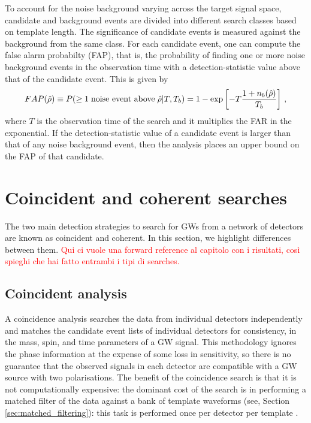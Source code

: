 \documentclass[binding=0.6cm, LaM]{sapthesis}
\newcommand{\fpg}[1]{\textcolor{red}{#1} }
\begin{document}
	To account for the noise background varying across the target signal space, 
	candidate and background events are divided into different search classes based on template length. 
	The significance of candidate events is measured against the background from the same class. 
	For each candidate event, one can compute the false alarm probabilty (FAP), that is, the probability of finding one or more 
	noise background events in the observation time with a detection-statistic value above that of the candidate event.  This is given by 
		\begin{equation}
			FAP(\hat \rho) \equiv P(\geq 1 \hspace*{0.1cm}\text{noise event above}\hspace*{0.1cm} \hat \rho|T,T_b) = 1 - \exp\left[-T{{1+n_b(\hat \rho)} \over{T_b}}\right]\,,
		\end{equation}
	where $T$ is the observation time of the search and it multiplies the FAR in the exponential.
	If the detection-statistic value of a candidate event is larger 
	than that of any noise background event, 
	then the analysis places an upper bound on the FAP of that candidate. 
	

\section{Coincident and coherent searches}

	The two main detection strategies to search for GWs 	
	from a network of detectors are known as coincident and coherent.  In this section, we highlight differences between them.  \fpg{Qui ci vuole una forward reference al capitolo con i risultati, cos\`i spieghi che hai fatto entrambi i tipi di searches.}

\subsection{Coincident analysis}

	A coincidence analysis searches the data from individual detectors independently 	
	and matches the candidate event lists of individual detectors for consistency,
	in the mass, spin, and time parameters of a GW signal.
	This methodology ignores the phase information at the expense of some loss in sensitivity, 
	so there is no guarantee that the observed signals in each detector 
	are compatible with a GW source with two polarisations.
	The benefit of the coincidence search is that it is not computationally expensive: 
	the dominant cost of the search is in performing a matched filter 
	of the data against a bank of template waveforms (see, Section \ref{sec:matched_filtering}):
        this task is performed once per detector per template \cite{28, 45}.
\end{document}

